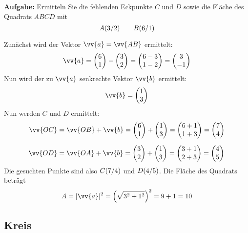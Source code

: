 \textbf{Aufgabe:} Ermitteln Sie die fehlenden Eckpunkte $C$ und $D$ sowie die Fläche des Quadrats $ABCD$ mit
\[
  \pxy[A]{3,2} \qquad \pxy[B]{6,1}
\]
\begin{center}
\end{center}
Zunächst wird der Vektor $\vv{a} = \vv{AB}$ ermittelt:
\[
  \vv{a} = \vxy{6,1}-\vxy{3,2} = \vxy{6-3,1-2} = \vxy{3,-1}
\]
Nun wird der zu $\vv{a}$ senkrechte Vektor $\vv{b}$ ermittelt:
\[
  \vv{b} = \vxy{1,3}
\]
Nun werden $C$ und $D$ ermittelt:
\begin{align*}
  \vv{OC} &= \vv{OB}+\vv{b} = \vxy{6,1} + \vxy{1,3} = \vxy{6+1,1+3} = \vxy{7,4} \\[2mm]
  \vv{OD} &= \vv{OA}+\vv{b} = \vxy{3,2} + \vxy{1,3} = \vxy{3+1,2+3} = \vxy{4,5}
\end{align*}
Die gesuchten Punkte sind also $\pxy[C]{7,4}$ und $\pxy[D]{4,5}$. Die Fläche des Quadrats beträgt
\[
  A = |\vv{a}|^{2} = \left(\sqrt{3^{2}+1^{2}}\right)^{2} = 9+1 = 10
\]


\newpage
\subsection{Kreis}

